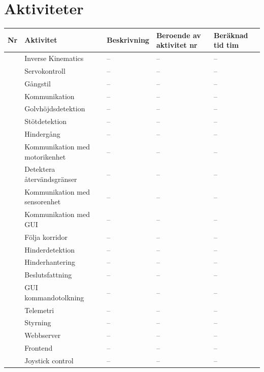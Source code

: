 \documentclass[a4paper,titlepage,12pt]{article}
\newcounter{aktNr}
\newcommand{\nextAktNr}{\stepcounter{aktNr}\arabic{aktNr}}
\begin{document}
	\section{Aktiviteter}
	\renewcommand*{\arraystretch}{1.4}
	\begin{longtable}[c]{ c p{3cm} p{6cm} p{3cm} p{2cm}}
		\textbf{Nr} & \textbf{Aktivitet} & \textbf{Beskrivning} & \textbf{Beroende av aktivitet nr} & \textbf{Beräknad tid tim} \\ \midrule
		\nextAktNr{} & Inverse Kinematics & -- & -- & -- \\ \midrule
		\nextAktNr{} & Servokontroll & -- & -- & -- \\ \midrule
		\nextAktNr{} & Gångstil & -- & -- & -- \\ \midrule
		\nextAktNr{} & Kommunikation & -- & -- & -- \\ \midrule
		\nextAktNr{} & Golvhöjdsdetektion & -- & -- & -- \\ \midrule
		\nextAktNr{} & Stötdetektion & -- & -- & -- \\ \midrule
		\nextAktNr{} & Hindergång & -- & -- & -- \\ \midrule
		\nextAktNr{} & Kommunikation med motorikenhet & -- & -- & -- \\ \midrule
		\nextAktNr{} & Detektera återvändsgränser & -- & -- & -- \\ \midrule
		\nextAktNr{} & Kommunikation med sensorenhet & -- & -- & -- \\ \midrule
		\nextAktNr{} & Kommunikation med GUI & -- & -- & -- \\ \midrule
		\nextAktNr{} & Följa korridor & -- & -- & -- \\ \midrule
		\nextAktNr{} & Hinderdetektion & -- & -- & -- \\ \midrule
		\nextAktNr{} & Hinderhantering & -- & -- & -- \\ \midrule
		\nextAktNr{} & Beslutsfattning & -- & -- & -- \\ \midrule
		\nextAktNr{} & GUI kommandotolkning & -- & -- & -- \\ \midrule
		\nextAktNr{} & Telemetri & -- & -- & -- \\ \midrule
		\nextAktNr{} & Styrning & -- & -- & -- \\ \midrule
		\nextAktNr{} & Webbserver & -- & -- & -- \\ \midrule
		\nextAktNr{} & Frontend & -- & -- & -- \\ \midrule
		\nextAktNr{} & Joystick control & -- & -- & -- \\ \midrule

\end{longtable}
\end{document}
